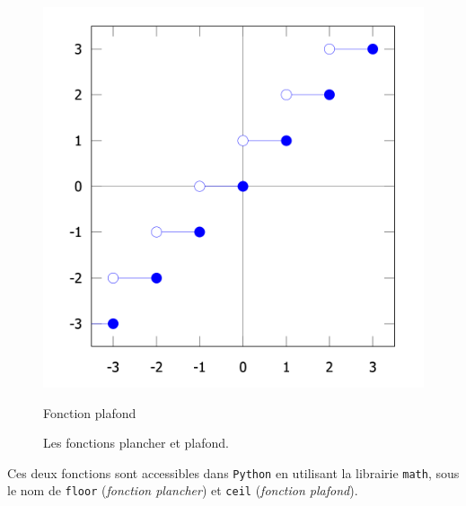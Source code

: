 \documentclass[
  letterpaper,
]{scrbook}
\theoremstyle{plain}
\theoremstyle{definition}
\theoremstyle{definition}
\theoremstyle{remark}
\begin{document}
\begin{figure}
\begin{minipage}[t]{0.50\linewidth}
{{\includegraphics{figs/ceiling_function.png}

}

\caption{Fonction plafond}

}

\end{minipage}%

\caption{\label{fig-floor-ceiling}Les fonctions plancher et plafond.}

\end{figure}

Ces deux fonctions sont accessibles dans \texttt{Python} en utilisant la
librairie \texttt{math}, sous le nom de \texttt{floor} (\emph{fonction
plancher}) et \texttt{ceil} (\emph{fonction plafond}).
\end{document}
